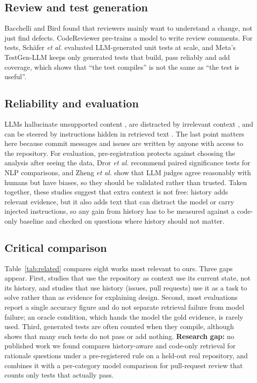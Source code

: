 \documentclass[12pt,onecolumn,draftclsnofoot]{IEEEtran}
\begin{document}
\subsection{Review and test generation}
Bacchelli and Bird \cite{bacchelli2013review} found that reviewers mainly want to understand a change, not just find defects. CodeReviewer \cite{li2022codereviewer} pre-trains a model to write review comments. For tests, Sch\"afer \emph{et al.} \cite{schafer2024testpilot} evaluated LLM-generated unit tests at scale, and Meta's TestGen-LLM \cite{alshahwan2024testgen} keeps only generated tests that build, pass reliably and add coverage, which shows that ``the test compiles'' is not the same as ``the test is useful''.

\subsection{Reliability and evaluation}
LLMs hallucinate unsupported content \cite{ji2023hallucination}, are distracted by irrelevant context \cite{shi2023distracted}, and can be steered by instructions hidden in retrieved text \cite{greshake2023injection}. The last point matters here because commit messages and issues are written by anyone with access to the repository. For evaluation, pre-registration \cite{nosek2018prereg} protects against choosing the analysis after seeing the data, Dror \emph{et al.} \cite{dror2018significance} recommend paired significance tests for NLP comparisons, and Zheng \emph{et al.} \cite{zheng2023judge} show that LLM judges agree reasonably with humans but have biases, so they should be validated rather than trusted. Taken together, these studies suggest that extra context is not free: history adds relevant evidence, but it also adds text that can distract the model or carry injected instructions, so any gain from history has to be measured against a code-only baseline and checked on questions where history should not matter.

\subsection{Critical comparison}
Table~\ref{tab:related} compares eight works most relevant to ours. Three gaps appear. First, studies that use the repository as context use its current state, not its history, and studies that use history (issues, pull requests) use it as a task to solve rather than as evidence for explaining design. Second, most evaluations report a single accuracy figure and do not separate retrieval failure from model failure; an oracle condition, which hands the model the gold evidence, is rarely used. Third, generated tests are often counted when they compile, although \cite{alshahwan2024testgen} shows that many such tests do not pass or add nothing. \textbf{Research gap:} no published work we found compares history-aware and code-only retrieval for rationale questions under a pre-registered rule on a held-out real repository, and combines it with a per-category model comparison for pull-request review that counts only tests that actually pass.
\end{document}
